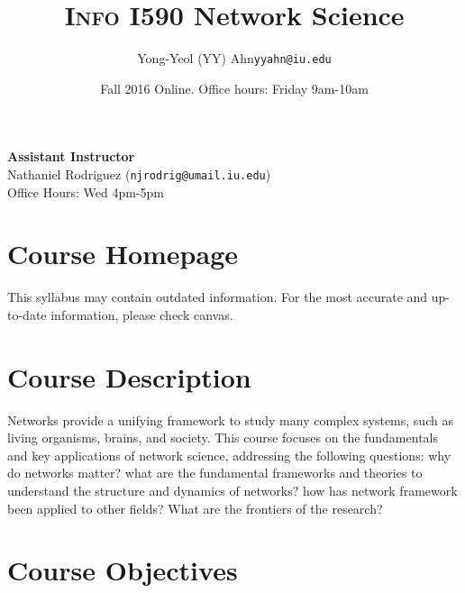 \documentclass[11pt,article,oneside]{memoir}
\makeatletter
\def\myauthor{Author}
\def\mytitle{Title}
\def\myemail{yyahn@iu.edu}
\def\myauthor{Yong-Yeol (YY) Ahn}
\def\mytitle{{\normalsize \textsc{Info} I590 \newline} \HUGE Network Science}
\makeatother
\begin{document}

\def\ind{\hangindent=1 true cm\hangafter=1 \noindent}
\def\labelitemi{$\cdot$}


\title{\LARGE \mytitle}     
\author{\Large\myauthor \newline \footnotesize\texttt{\noindent\myemail}}
\date{Fall 2016 Online. %
\newline Office hours: Friday 9am-10am}

\maketitle

\vspace{-20pt}
{\bfseries Assistant Instructor} \\ Nathaniel Rodriguez (\texttt{njrodrig@umail.iu.edu}) \\ Office Hours: Wed 4pm-5pm 

\section{Course Homepage}

This syllabus may contain outdated information. For the most accurate and up-to-date information, 
please check canvas. %

\section{Course Description}

Networks provide a unifying framework to study many complex systems, such as
living organisms, brains, and society. This course focuses on the fundamentals
and key applications of network science, addressing the following questions:
why do networks matter? what are the fundamental frameworks and theories to
understand the structure and dynamics of networks? how has network framework
been applied to other fields? What are the frontiers of the research?

\section{Course Objectives}
\end{document}
